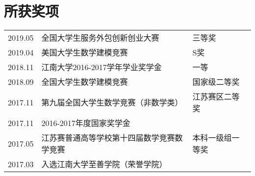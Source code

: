 \documentclass[]{deedy-resume-openfont}
\begin{document}
\begin{minipage}[t]{0.73\textwidth}
	\section{所获奖项}
    \begin{tabular}{lll}
        2019.05 & 全国大学生服务外包创新创业大赛 & 三等奖 \\
        2019.04 & 美国大学生数学建模竞赛 & S奖 \\
        2018.11 & 江南大学2016-2017学年学业奖学金 & 一等 \\
        2018.09 & 全国大学生数学建模竞赛 & 国家级二等奖 \\
        2017.11 & 第九届全国大学生数学竞赛（非数学类） & 江苏赛区二等奖 \\
        2017.11 & 2016-2017年度国家奖学金 & \\
        2017.05 & 江苏赛普通高等学校第十四届数学竞赛数学竞赛 & 本科一级组一等奖\\
        2017.03 & 入选江南大学至善学院（荣誉学院）& \\
	\end{tabular}
\end{minipage}
\end{document}
